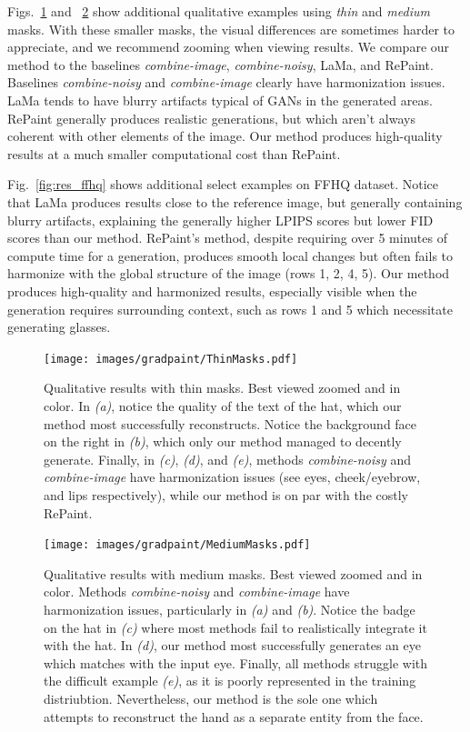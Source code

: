 Figs.~\ref{fig:qualitative_thin} and ~\ref{fig:qualitative_thick} show additional qualitative examples using \emph{thin} and \emph{medium} masks. With these smaller masks, the visual differences are sometimes harder to appreciate, and we recommend zooming when viewing results. We compare our method to the baselines \emph{combine-image}, \emph{combine-noisy}, LaMa, and RePaint. Baselines \emph{combine-noisy} and \emph{combine-image} clearly have harmonization issues. LaMa tends to have blurry artifacts typical of GANs in the generated areas. RePaint generally produces realistic generations, but which aren't always coherent with other elements of the image. Our method produces high-quality results at a much smaller computational cost than RePaint.


Fig.~\ref{fig:res_ffhq} shows additional select examples on FFHQ dataset. Notice that LaMa produces results close to the reference image, but generally containing blurry artifacts, explaining the generally higher LPIPS scores but lower FID scores than our method. RePaint's method, despite requiring over 5 minutes of compute time for a generation, produces smooth local changes but often fails to harmonize with the global structure of the image (rows 1, 2, 4, 5). Our method produces high-quality and harmonized results, especially visible when the generation requires surrounding context, such as rows 1 and 5 which necessitate generating glasses.

\begin{figure}
    \centering
    \texttt{[image: images/gradpaint/ThinMasks.pdf]}
    \caption{Qualitative results with thin masks. Best viewed zoomed and in color. In \emph{(a)}, notice the quality of the text of the hat, which our method most successfully reconstructs. Notice the background face on the right in \emph{(b)}, which only our method managed to decently generate. Finally, in \emph{(c)}, \emph{(d)}, and \emph{(e)}, methods \emph{combine-noisy} and \emph{combine-image} have harmonization issues (see eyes, cheek/eyebrow, and lips respectively), while our method is on par with the costly RePaint.}
    \label{fig:qualitative_thin}
\end{figure}

\begin{figure}
    \centering
    \texttt{[image: images/gradpaint/MediumMasks.pdf]}
    \caption{Qualitative results with medium masks. Best viewed zoomed and in color. Methods \emph{combine-noisy} and \emph{combine-image} have harmonization issues, particularly in \emph{(a)} and \emph{(b)}. Notice the badge on the hat in \emph{(c)} where most methods fail to realistically integrate it with the hat. In \emph{(d)}, our method most successfully generates an eye which matches with the input eye. Finally, all methods struggle with the difficult example \emph{(e)}, as it is poorly represented in the training distriubtion.  Nevertheless, our method is the sole one which attempts to reconstruct the hand as a separate entity from the face.}
    \label{fig:qualitative_thick}
\end{figure}

